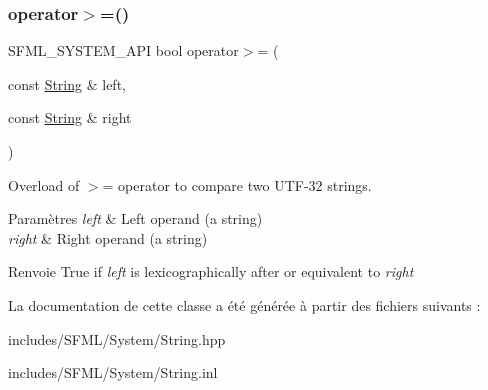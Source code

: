 \subsubsection{\texorpdfstring{operator$>$=()}{operator>=()}}
{\footnotesize\ttfamily S\+F\+M\+L\+\_\+\+S\+Y\+S\+T\+E\+M\+\_\+\+A\+PI bool operator$>$= (\begin{DoxyParamCaption}\item[{const \hyperlink{classsf_1_1String}{String} \&}]{left,  }\item[{const \hyperlink{classsf_1_1String}{String} \&}]{right }\end{DoxyParamCaption})\hspace{0.3cm}{\ttfamily [related]}}



Overload of $>$= operator to compare two U\+T\+F-\/32 strings. 


\begin{DoxyParams}{Paramètres}
{\em left} & Left operand (a string) \\
\hline
{\em right} & Right operand (a string)\\
\hline
\end{DoxyParams}
\begin{DoxyReturn}{Renvoie}
True if {\itshape left} is lexicographically after or equivalent to {\itshape right} 
\end{DoxyReturn}


La documentation de cette classe a été générée à partir des fichiers suivants \+:\begin{DoxyCompactItemize}
\item 
includes/\+S\+F\+M\+L/\+System/String.\+hpp\item 
includes/\+S\+F\+M\+L/\+System/String.\+inl\end{DoxyCompactItemize}
